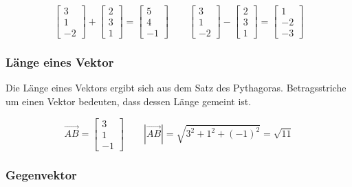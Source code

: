 \begin{equation*}
    \begin{bmatrix}
        3 \\
        1 \\
        -2
    \end{bmatrix}
    +
    \begin{bmatrix}
        2 \\
        3 \\
        1
    \end{bmatrix}
    =
    \begin{bmatrix}
        5 \\
        4 \\
        -1
    \end{bmatrix}
    \qquad
    \begin{bmatrix}
        3 \\
        1 \\
        -2
    \end{bmatrix}
    -
    \begin{bmatrix}
        2 \\
        3 \\
        1
    \end{bmatrix}
    =
    \begin{bmatrix}
        1 \\
        -2 \\
        -3
    \end{bmatrix}
\end{equation*}

\subsubsection{Länge eines Vektor}

Die Länge eines Vektors ergibt sich aus dem Satz des Pythagoras.
Betragsstriche um einen Vektor bedeuten, dass dessen Länge gemeint ist.

\begin{equation*}
    \vec{AB} = \begin{bmatrix}
        3 \\
        1 \\
        -1
    \end{bmatrix}
    \qquad | \vec{AB} | = \sqrt{3^2 + 1^2 + (-1)^2} = \sqrt{11}
\end{equation*}

\subsubsection{Gegenvektor}


